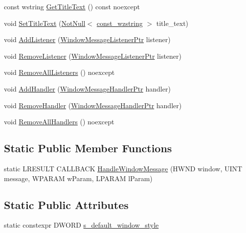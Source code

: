 \begin{DoxyCompactItemize}
\item 
const wstring \mbox{\hyperlink{classmage_1_1_window_a62bf5cd2d9dbdf53947cec3cccee04db}{Get\+Title\+Text}} () const noexcept
\item 
void \mbox{\hyperlink{classmage_1_1_window_a7f5e2e528eb26bf6750131a1d72db28e}{Set\+Title\+Text}} (\mbox{\hyperlink{namespacemage_a8769f9d670d6b585ea306cb1062af94b}{Not\+Null}}$<$ \mbox{\hyperlink{namespacemage_ac409e0f2a22292a3a4cd42742994fbf0}{const\+\_\+wzstring}} $>$ title\+\_\+text)
\item 
void \mbox{\hyperlink{classmage_1_1_window_ac6020962e1fd29118675207bde5d216d}{Add\+Listener}} (\mbox{\hyperlink{classmage_1_1_window_a0e0a4f2a3f6db176f6aec454b94a06fb}{Window\+Message\+Listener\+Ptr}} listener)
\item 
void \mbox{\hyperlink{classmage_1_1_window_a0f30903e406cf3cde3682befafcd3eba}{Remove\+Listener}} (\mbox{\hyperlink{classmage_1_1_window_a0e0a4f2a3f6db176f6aec454b94a06fb}{Window\+Message\+Listener\+Ptr}} listener)
\item 
void \mbox{\hyperlink{classmage_1_1_window_a1bb37381e94c541027d1ee4da7f6c7e2}{Remove\+All\+Listeners}} () noexcept
\item 
void \mbox{\hyperlink{classmage_1_1_window_ae33b5ea74354830278c9ee130fa917c7}{Add\+Handler}} (\mbox{\hyperlink{classmage_1_1_window_add1d792fb9f71e70d4fb07409d80cfdd}{Window\+Message\+Handler\+Ptr}} handler)
\item 
void \mbox{\hyperlink{classmage_1_1_window_a81b23a696f73636ec9aa985ceda391b4}{Remove\+Handler}} (\mbox{\hyperlink{classmage_1_1_window_add1d792fb9f71e70d4fb07409d80cfdd}{Window\+Message\+Handler\+Ptr}} handler)
\item 
void \mbox{\hyperlink{classmage_1_1_window_a9b1efac3d0bd27df4e33ab704bc59f98}{Remove\+All\+Handlers}} () noexcept
\end{DoxyCompactItemize}
\subsection*{Static Public Member Functions}
\begin{DoxyCompactItemize}
\item 
static L\+R\+E\+S\+U\+LT C\+A\+L\+L\+B\+A\+CK \mbox{\hyperlink{classmage_1_1_window_a1bd8a958bb5e15f22982a74a513a715e}{Handle\+Window\+Message}} (H\+W\+ND window, U\+I\+NT message, W\+P\+A\+R\+AM w\+Param, L\+P\+A\+R\+AM l\+Param)
\end{DoxyCompactItemize}
\subsection*{Static Public Attributes}
\begin{DoxyCompactItemize}
\item 
static constexpr D\+W\+O\+RD \mbox{\hyperlink{classmage_1_1_window_ac680bdd3d5359f66b2dea082ef45e0da}{s\+\_\+default\+\_\+window\+\_\+style}}
\end{DoxyCompactItemize}
